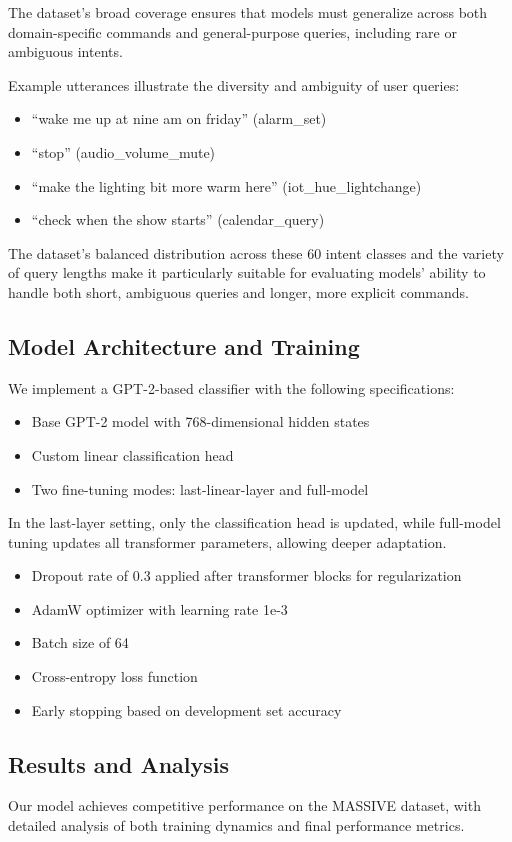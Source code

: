 \documentclass{article}
\begin{document}
The dataset's broad coverage ensures that models must generalize across both domain-specific commands and general-purpose queries, including rare or ambiguous intents.

Example utterances illustrate the diversity and ambiguity of user queries:
\begin{itemize}
    \item ``wake me up at nine am on friday'' (alarm\_set)
    \item ``stop'' (audio\_volume\_mute)
    \item ``make the lighting bit more warm here'' (iot\_hue\_lightchange)
    \item ``check when the show starts'' (calendar\_query)
\end{itemize}

The dataset's balanced distribution across these 60 intent classes and the variety of query lengths make it particularly suitable for evaluating models' ability to handle both short, ambiguous queries and longer, more explicit commands.

\subsection{Model Architecture and Training}
We implement a GPT-2-based classifier with the following specifications:
\begin{itemize}
    \item Base GPT-2 model with 768-dimensional hidden states
    \item Custom linear classification head
    \item Two fine-tuning modes: last-linear-layer and full-model
\end{itemize}
In the last-layer setting, only the classification head is updated, while full-model tuning updates all transformer parameters, allowing deeper adaptation.
\begin{itemize}
    \item Dropout rate of 0.3 applied after transformer blocks for regularization
    \item AdamW optimizer with learning rate 1e-3
    \item Batch size of 64
    \item Cross-entropy loss function
    \item Early stopping based on development set accuracy
\end{itemize}

\subsection{Results and Analysis}
Our model achieves competitive performance on the MASSIVE dataset, with detailed analysis of both training dynamics and final performance metrics.
\end{document}
